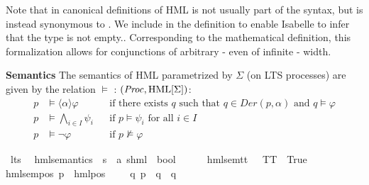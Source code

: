 \begin{isabellebody}
\begin{isamarkuptext}
Note that in canonical definitions of HML  is not usually part of the syntax,
but is instead synonymous to \isa{{\isasymAnd}{\isacharbraceleft}{\kern0pt}{\isacharbraceright}{\kern0pt}}.
We include  in the definition to enable Isabelle to infer that the type  is not empty..
Corresponding to the mathematical definition, this formalization allows for conjunctions of arbitrary - even of infinite - width.%
\end{isamarkuptext}\isamarkuptrue%
%
\begin{isamarkuptext}%
\textbf{Semantics} The semantics of HML parametrized by $\Sigma$ (on LTS processes) are given by the relation $\models$ : $(\mathit{Proc}, \text{HML}[\Sigma])$:
\begin{align*}
  p &\models \langle \alpha \rangle\varphi && \text{if there exists } q \text{ such that } q\in\mathit{Der}(p, \alpha) \text{ and } q \models\varphi \\
  p &\models \bigwedge_{i \in I} \psi_i && \text{if } p\models\psi_i \text{ for all } i\in I \\
  p &\models \lnot\varphi && \text{if } p\not\models\varphi
\end{align*}%
\end{isamarkuptext}\isamarkuptrue%
\isamarkupfalse%
\ lts\ \isanewline
\isanewline
{}\isamarkupfalse%
\ hml{\isacharunderscore}{\kern0pt}semantics\ {\isacharcolon}{\kern0pt}{\isacharcolon}{\kern0pt}\ {\isacartoucheopen}{\isacharprime}{\kern0pt}s\ {\isasymRightarrow}\ {\isacharparenleft}{\kern0pt}{\isacharprime}{\kern0pt}a{\isacharcomma}{\kern0pt}\ {\isacharprime}{\kern0pt}s{\isacharparenright}{\kern0pt}hml\ {\isasymRightarrow}\ bool{\isacartoucheclose}\isanewline
{\isacharparenleft}{\kern0pt}{\isacartoucheopen}{\isacharunderscore}{\kern0pt}\ {\isasymTurnstile}\ {\isacharunderscore}{\kern0pt}{\isacartoucheclose}\ {\isacharbrackleft}{\kern0pt}{}{}{\isacharcomma}{\kern0pt}\ {}{}{\isacharbrackright}{\kern0pt}\ {}{}{\isacharparenright}{\kern0pt}\isanewline
{}\isanewline
hml{\isacharunderscore}{\kern0pt}sem{\isacharunderscore}{\kern0pt}tt{\isacharcolon}{\kern0pt}\ {\isacartoucheopen}{\isacharparenleft}{\kern0pt}{\isacharunderscore}{\kern0pt}\ {\isasymTurnstile}\ TT{\isacharparenright}{\kern0pt}\ {\isacharequal}{\kern0pt}\ True{\isacartoucheclose}\ {\isacharbar}{\kern0pt}\isanewline
hml{\isacharunderscore}{\kern0pt}sem{\isacharunderscore}{\kern0pt}pos{\isacharcolon}{\kern0pt}\ {\isacartoucheopen}{\isacharparenleft}{\kern0pt}p\ {\isasymTurnstile}\ {\isacharparenleft}{\kern0pt}hml{\isacharunderscore}{\kern0pt}pos\ {\isasymalpha}\ {\isasymphi}{\isacharparenright}{\kern0pt}{\isacharparenright}{\kern0pt}\ {\isacharequal}{\kern0pt}\ {\isacharparenleft}{\kern0pt}{\isasymexists}\ q{\isachardot}{\kern0pt}\ {\isacharparenleft}{\kern0pt}p\ {\isasymmapsto}{\isasymalpha}\ q{\isacharparenright}{\kern0pt}\ {\isasymand}\ q\ {\isasymTurnstile}\ {\isasymphi}{\isacharparenright}{\kern0pt}{\isacartoucheclose}\ {\isacharbar}{\kern0pt}\isanewline

\end{isabellebody}
